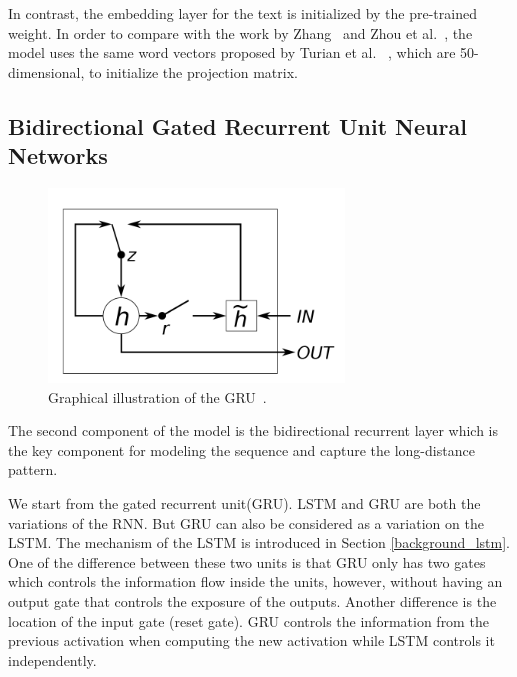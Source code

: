 In contrast, the embedding layer for the text is initialized by the pre-trained weight. In order to compare with the work by Zhang~\cite{zhang2015relation} and Zhou et al.~\cite{zhou2016attention}, the model uses the same word vectors proposed by Turian et al. ~\cite{turian2010word}, which are 50-dimensional, to initialize the projection matrix.


\subsection{Bidirectional Gated Recurrent Unit Neural Networks}
\begin{figure}
\centering
\includegraphics[width=0.7\textwidth]{gru.png}
\caption{Graphical illustration of the GRU~\cite{Chung2014}.}
\label{GRU}
\end{figure}

The second component of the model is the bidirectional recurrent layer which is the key component for modeling the sequence and capture the long-distance pattern. 

We start from the gated recurrent unit(GRU). LSTM and GRU are both the variations of the RNN. But GRU can also be considered as a variation on the LSTM. The mechanism of the LSTM is introduced in Section \ref{background_lstm}. One of the difference between these two units is that GRU only has two gates which controls the information flow inside the units, however, without having an output gate that controls the exposure of the outputs. Another difference is the location of the input gate (reset gate). GRU controls the information from the previous activation when computing the new activation while LSTM controls it independently.

